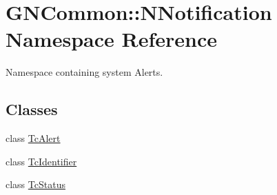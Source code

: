 \hypertarget{namespace_g_n_common_1_1_n_notification}{}\section{G\+N\+Common\+:\+:N\+Notification Namespace Reference}
\label{namespace_g_n_common_1_1_n_notification}


Namespace containing system Alerts.  


\subsection*{Classes}
\begin{DoxyCompactItemize}
\item 
class \mbox{\hyperlink{class_g_n_common_1_1_n_notification_1_1_tc_alert}{Tc\+Alert}}
\item 
class \mbox{\hyperlink{class_g_n_common_1_1_n_notification_1_1_tc_identifier}{Tc\+Identifier}}
\item 
class \mbox{\hyperlink{class_g_n_common_1_1_n_notification_1_1_tc_status}{Tc\+Status}}
\end{DoxyCompactItemize}
